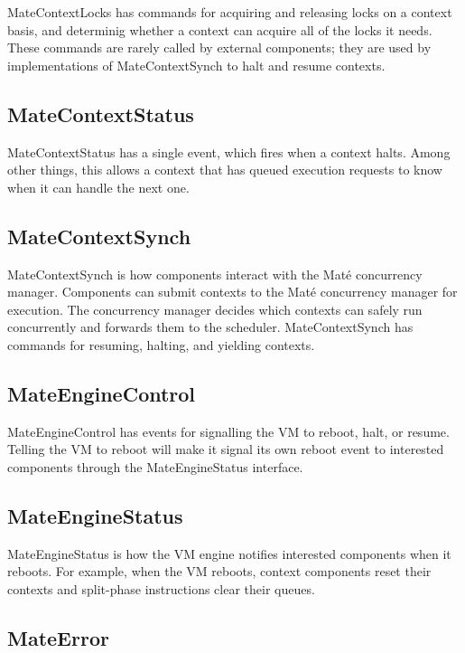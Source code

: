 \documentclass[12pt]{article}
\newcommand{\mate}{Mat\'{e}\xspace}
\begin{document}
MateContextLocks has commands for acquiring and releasing locks on a
context basis, and determinig whether a context can acquire all of the
locks it needs. These commands are rarely called by external
components; they are used by implementations of MateContextSynch to
halt and resume contexts.

\subsection{MateContextStatus}

MateContextStatus has a single event, which fires when a context
halts. Among other things, this allows a context that has queued
execution requests to know when it can handle the next one.

\subsection{MateContextSynch}

MateContextSynch is how components interact with the \mate concurrency
manager. Components can submit contexts to the \mate concurrency
manager for execution. The concurrency manager decides which contexts
can safely run concurrently and forwards them to the
scheduler. MateContextSynch has commands for resuming, halting, and
yielding contexts.

\subsection{MateEngineControl}

MateEngineControl has events for signalling the VM to reboot, halt, or
resume. Telling the VM to reboot will make it signal its own reboot
event to interested components through the MateEngineStatus interface.

\subsection{MateEngineStatus}

MateEngineStatus is how the VM engine notifies interested components
when it reboots. For example, when the VM reboots, context components
reset their contexts and split-phase instructions clear their queues.

\subsection{MateError}
\end{document}
